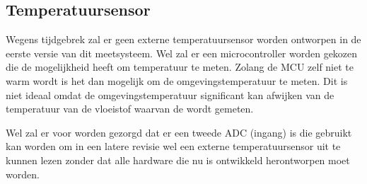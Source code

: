 \subsection{Temperatuursensor}
Wegens tijdgebrek zal er geen externe temperatuursensor worden ontworpen in de eerste versie van dit \si{\pH} meetsysteem. Wel zal er een microcontroller worden gekozen die de mogelijkheid heeft om temperatuur te meten. Zolang de MCU zelf niet te warm wordt is het dan mogelijk om de omgevingstemperatuur te meten. Dit is niet ideaal omdat de omgevingstemperatuur significant kan afwijken van de temperatuur van de vloeistof waarvan de \si{\pH} wordt gemeten.

Wel zal er voor worden gezorgd dat er een tweede ADC (ingang) is die gebruikt kan worden om in een latere revisie wel een externe temperatuursensor uit te kunnen lezen zonder dat alle hardware die nu is ontwikkeld herontworpen moet worden.



